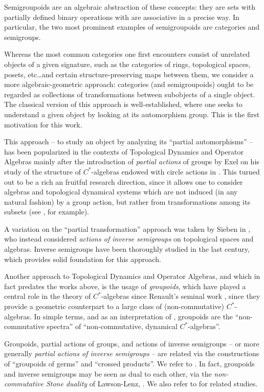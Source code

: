 \documentclass[a4paper]{amsart}
\theoremstyle{plain}    \newtheorem{theorem}[generalnumbering]{Theorem}
\theoremstyle{plain}    \newtheorem{corollary}[generalnumbering]{Corollary}
\theoremstyle{definition}   \newtheorem{definition}[generalnumbering]{Definition}
\theoremstyle{definition}   \newtheorem{example}[generalnumbering]{Example}
\theoremstyle{plain}    \newtheorem{proposition}[generalnumbering]{Proposition}
\theoremstyle{plain}    \newtheorem{lemma}[generalnumbering]{Lemma}
\theoremstyle{plain}    \newtheorem{plainstyle}[generalnumbering]{\namefordifferentenvironment}
\theoremstyle{plain}    \newtheorem*{plainstyle*}{\namefordifferentenvironment}
\theoremstyle{definition}    \newtheorem{definitionstyle}[generalnumbering]{\namefordifferentenvironment}
\theoremstyle{definition}    \newtheorem*{definitionstyle*}{\namefordifferentenvironment}
\begin{document}
Semigroupoids are an algebraic abstraction of these concepts: they are sets with partially defined binary operations with are associative in a precise way. In particular, the two most prominent examples of semigroupoids are categories and semigroups.

Whereas the most common categories one first encounters consist of unrelated objects of a given signature, such as the categories of rings, topological spaces, posets, etc\ldots and certain structure-preserving maps between them, we consider a more algebraic-geometric approach: categories (and semigroupoids) ought to be regarded as collections of transformations between subobjects of a single object. The classical version of this approach is well-established, where one seeks to understand a given object by looking at its automorphism group. This is the first motivation for this work.

This approach -- to study an object by analyzing its ``partial automorphisms'' -- has been popularized in the contexts of Topological Dynamics and Operator Algebras mainly after the introduction of \emph{partial actions} of groups by Exel on his study of the structure of $C^*$-algebras endowed with circle actions in \cite{MR1276163}. This turned out to be a rich an fruitful research direction, since it allows one to consider algebras and topological dynamical systems which are not induced (in any natural fashion) by a group action, but rather from transformations among its subsets (see \cite{arxiv1804.00396,MR3789176,MR2645883}, for example).

A variation on the ``partial transformation'' approach was taken by Sieben in \cite{MR1671944,MR1456588}, who instead considered \emph{actions of inverse semigroups} on topological spaces and algebras. Inverse semigroups have been thoroughly studied in the last century, which provides solid foundation for this approach.

Another approach to Topological Dynamics and Operator Algebras, and which in fact predates the works above, is the usage of \emph{groupoids}, which have played a central role in the theory of $C^*$-algebras since Renault's seminal work \cite{MR584266}, since they provide a geometric counterpart to a large class of (non-commutative) $C^*$-algebras. In simple terms, and as an interpretation of \cite[Theorem 5.9]{MR2460017}, groupoids are the ``non-commutative spectra'' of ``non-commutative, dynamical $C^*$-algebras''.

Groupoids, partial actions of groups, and actions of inverse semigroups -- or more generally \emph{partial actions of inverse semigroups} -- are related via the constructions of ``groupoids of germs'' and ``crossed products''. We refer to \cite{MR2045419,arxiv1804.00396,MR3743184,MR3851326,MR2799098,MR1724106,MR1671944,MR2565546}. In fact, groupoids and inverse semigroups may be seen as dual to each other, via the \emph{non-commutative Stone duality} of Lawson-Lenz, \cite{MR3077869}. We also refer to \cite{MR2969047,MR2644910,MR2304314} for related studies.
\end{document}
